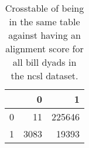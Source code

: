 \begin{table}[ht]
\centering
\begin{tabular}{rrr}
  \hline
 & 0 & 1 \\ 
  \hline
0 &  11 & 225646 \\ 
  1 & 3083 & 19393 \\ 
   \hline
\end{tabular}
\caption{Crosstable of being in the same table against having
an alignment score for all bill dyads in the ncsl dataset.} 
\label{tab:ncsl_crosstab}
\end{table}
